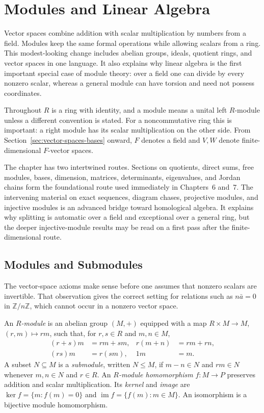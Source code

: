\chapter{Modules and Linear Algebra}\label{chap:modules-linear-algebra}

Vector spaces combine addition with scalar multiplication by numbers from a
field. Modules keep the same formal operations while allowing scalars from a
ring. This modest-looking change includes abelian groups, ideals, quotient
rings, and vector spaces in one language. It also explains why linear algebra
is the first important special case of module theory: over a field one can
divide by every nonzero scalar, whereas a general module can have torsion and
need not possess coordinates.

Throughout \(R\) is a ring with identity, and a module means a unital left
\(R\)-module unless a different convention is stated. For a noncommutative
ring this is important: a right module has its scalar multiplication on the
other side. From Section~\ref{sec:vector-spaces-bases} onward, \(F\) denotes a field and \(V,W\) denote
finite-dimensional \(F\)-vector spaces.

The chapter has two intertwined routes.  Sections on quotients, direct sums,
free modules, bases, dimension, matrices, determinants, eigenvalues, and
Jordan chains form the foundational route used immediately in Chapters~6
and~7.  The intervening material on exact sequences, diagram chases,
projective modules, and injective modules is an advanced bridge toward
homological algebra.  It explains why splitting is automatic over a field
and exceptional over a general ring, but the deeper injective-module results
may be read on a first pass after the finite-dimensional route.

\section{Modules and Submodules}\label{sec:modules-submodules}
The vector-space axioms make sense before one assumes that nonzero scalars
are invertible. That observation gives the correct setting for relations such
as \(n\bar a=0\) in \(\mathbb Z/n\mathbb Z\), which cannot occur in a
nonzero vector space.

\begin{definition}
An \emph{\(R\)-module} is an abelian group \((M,+)\) equipped with a map
\(R\times M\to M\), \((r,m)\mapsto rm\), such that, for \(r,s\in R\) and
\(m,n\in M\),
\[
\begin{aligned}
(r+s)m&=rm+sm, & r(m+n)&=rm+rn,\\
(rs)m&=r(sm), & 1m&=m.
\end{aligned}
\]
A subset \(N\subseteq M\) is a \emph{submodule}, written \(N\leq M\), if
\(m-n\in N\) and \(rm\in N\) whenever \(m,n\in N\) and \(r\in R\).
An \emph{\(R\)-module homomorphism} \(f:M\to P\) preserves addition and
scalar multiplication. Its \emph{kernel} and \emph{image} are
\(\ker f=\{m:f(m)=0\}\) and \(\operatorname{im}f=\{f(m):m\in M\}\).
An isomorphism is a bijective module homomorphism.
\end{definition}

